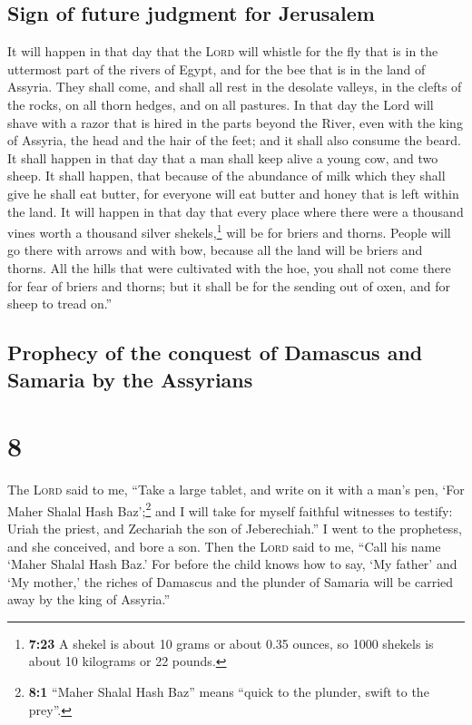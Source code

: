 \hypertarget{sign-of-future-judgment-for-jerusalem}{%
\subsection{Sign of future judgment for
Jerusalem}\label{sign-of-future-judgment-for-jerusalem}}

 It will happen in that day that the \textsc{Lord} will
whistle for the fly that is in the uttermost part of the rivers of
Egypt, and for the bee that is in the land of Assyria. 
They shall come, and shall all rest in the desolate valleys, in the
clefts of the rocks, on all thorn hedges, and on all pastures.
 In that day the Lord will shave with a razor that is
hired in the parts beyond the River, even with the king of Assyria, the
head and the hair of the feet; and it shall also consume the beard.
 It shall happen in that day that a man shall keep alive
a young cow, and two sheep.  It shall happen, that
because of the abundance of milk which they shall give he shall eat
butter, for everyone will eat butter and honey that is left within the
land.  It will happen in that day that every place where
there were a thousand vines worth a thousand silver shekels,\footnote{\textbf{7:23}
  A shekel is about 10 grams or about 0.35 ounces, so 1000 shekels is
  about 10 kilograms or 22 pounds.} will be for briers and thorns.
 People will go there with arrows and with bow, because
all the land will be briers and thorns.  All the hills
that were cultivated with the hoe, you shall not come there for fear of
briers and thorns; but it shall be for the sending out of oxen, and for
sheep to tread on.''

\hypertarget{prophecy-of-the-conquest-of-damascus-and-samaria-by-the-assyrians}{%
\subsection{Prophecy of the conquest of Damascus and Samaria by the
Assyrians}\label{prophecy-of-the-conquest-of-damascus-and-samaria-by-the-assyrians}}

\hypertarget{section-7}{%
\section{8}\label{section-7}}

 The \textsc{Lord} said to me, ``Take a large tablet, and
write on it with a man's pen, `For Maher Shalal Hash Baz';\footnote{\textbf{8:1}
  ``Maher Shalal Hash Baz'' means ``quick to the plunder, swift to the
  prey''.}  and I will take for myself faithful witnesses
to testify: Uriah the priest, and Zechariah the son of Jeberechiah.''
 I went to the prophetess, and she conceived, and bore a
son. Then the \textsc{Lord} said to me, ``Call his name `Maher Shalal
Hash Baz.'  For before the child knows how to say, `My
father' and `My mother,' the riches of Damascus and the plunder of
Samaria will be carried away by the king of Assyria.''

